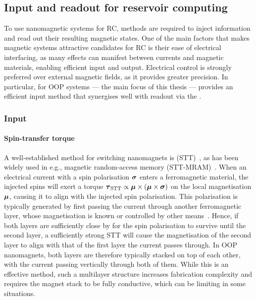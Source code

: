 \subsection{Input and readout for reservoir computing}\label{sec:1:ASI_IO}
To use nanomagnetic systems for RC, methods are required to inject information and read out their resulting magnetic states.
One of the main factors that makes magnetic systems attractive candidates for RC is their ease of electrical interfacing, as many effects can manifest between currents and magnetic materials, enabling efficient input and output.
Electrical control is strongly preferred over external magnetic fields, as it provides greater precision.
In particular, for OOP systems --- the main focus of this thesis ---  provides an efficient input method that synergises well with readout via the .

\subsubsection{Input}
\paragraph{Spin-transfer torque}
A well-established method for switching nanomagnets is  (STT)~\cite{SlonczewskiSTT}, as has been widely used in e.g., magnetic random-access memory (STT-MRAM)~\cite{brataas2012current}.
When an electrical current with a spin polarisation $\boldsymbol{\mathbf{\sigma}}$ enters a ferromagnetic material, the injected spins will exert a torque $\boldsymbol{\mathbf{\tau}}_\mathrm{STT} \propto \boldsymbol{\mathbf{\mu}} \times (\boldsymbol{\mathbf{\mu}} \times \boldsymbol{\mathbf{\sigma}})$ on the local magnetisation $\boldsymbol{\mathbf{\mu}}$, causing it to align with the injected spin polarisation.
This polarisation is typically generated by first passing the current through another ferromagnetic layer, whose magnetisation is known or controlled by other means~\cite{SOT_FM_AFM,mumax3tutorial}.
Hence, if both layers are sufficiently close by for the spin polarisation to survive until the second layer, a sufficiently strong STT will cause the magnetisation of the second layer to align with that of the first layer the current passes through.
In OOP nanomagnets, both layers are therefore typically stacked on top of each other, with the current passing vertically through both of them.
While this is an effective method, such a multilayer structure increases fabrication complexity and requires the magnet stack to be fully conductive, which can be limiting in some situations.

